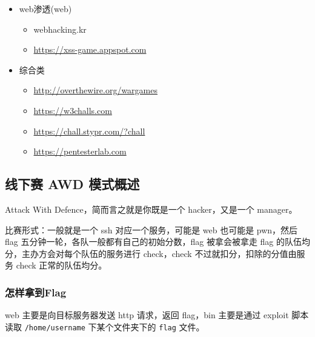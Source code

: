 \begin{itemize}
\begin{itemize}
        \item web渗透(web)
        \begin{itemize}
            \item webhacking.kr
            \item \href{https://xss-game.appspot.com}{https://xss-game.appspot.com}
        \end{itemize}
        
        \item 综合类
        \begin{itemize}
            \item \href{http://overthewire.org/wargames}{http://overthewire.org/wargames}
            \item \href{https://w3challs.com}{https://w3challs.com}
            \item \href{https://chall.stypr.com/?chall}{https://chall.stypr.com/?chall}
            \item \href{https://pentesterlab.com}{https://pentesterlab.com}
        \end{itemize}
    \end{itemize}
\end{itemize}

\subsection{线下赛 AWD 模式概述}
\indent \setlength{\parindent}{2em}

\indent Attack With Defence，简而言之就是你既是一个 hacker，又是一个 manager。

\indent 比赛形式：一般就是一个 ssh 对应一个服务，可能是 web 也可能是 pwn，然后 flag 五分钟一轮，各队一般都有自己的初始分数，flag 被拿会被拿走 flag 的队伍均分，主办方会对每个队伍的服务进行 check，check 不过就扣分，扣除的分值由服务 check 正常的队伍均分。

\subsubsection{怎样拿到Flag}
\indent \setlength{\parindent}{2em}
\intent web 主要是向目标服务器发送 http 请求，返回 flag，bin 主要是通过 exploit 脚本读取 \verb+/home/username+ 下某个文件夹下的 \verb+flag+ 文件。

